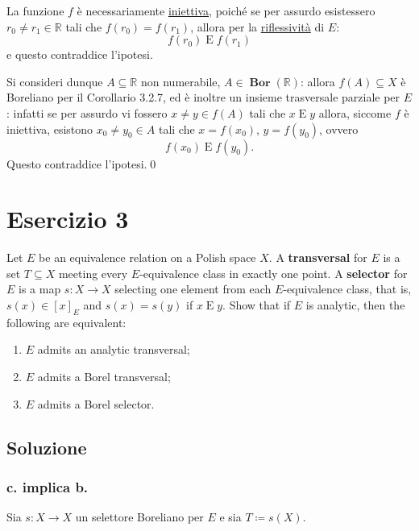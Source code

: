 \documentclass{article}
\newcommand{\1}{\mathds{1}}
\newcommand{\R}{\mathds{R}}
\begin{document}
La funzione \(f\) è necessariamente \uline{iniettiva}, poiché se per assurdo esistessero \(r_{0}\neq r_{1} \in \R\) tali che \(f(r_{0})=f(r_{1})\), allora per la \uline{riflessività} di \(E\):
\begin{equation*}
f(r_{0})\mathrel{E}f(r_{1})
\end{equation*}
e questo contraddice l'ipotesi.

Si consideri dunque \(A \subseteq \R\) non numerabile, \(A \in \bm{{\operatorname{Bor}}}(\R)\): allora \(f(A) \subseteq X\) è Boreliano per il Corollario 3.2.7, ed è inoltre un insieme trasversale parziale per \(E\): infatti se per assurdo vi fossero \(x\neq y \in f(A)\) tali che \(x\mathrel{E}y\) allora, siccome \(f\) è iniettiva, esistono \(x_{0}\neq y_{0} \in A\) tali che \(x=f(x_{0})\), \(y=f(y_{0})\), ovvero
\begin{equation*}
f(x_{0})\mathrel{E}f(y_{0}).
\end{equation*}
Questo contraddice l'ipotesi.\qed
\section{Esercizio 3}
\label{sec:org15bc569}

Let \(E\) be an equivalence relation on a Polish space \(X\). A \textbf{transversal} for \(E\) is a set \(T \subseteq X\) meeting every \(E\)-equivalence class in exactly one point. A \textbf{selector} for \(E\) is a map \(s: X \to X\) selecting one element from each \(E\)-equivalence class, that is, \(s(x) \in [x]_E\) and \(s(x) = s(y)\) if \(x \mathrel{E} y\). Show that if \(E\) is analytic, then the following are equivalent:

\begin{enumerate}
\item \(E\) admits an analytic transversal;
\item \(E\) admits a Borel transversal;
\item \(E\) admits a Borel selector.
\end{enumerate}
\subsection{Soluzione}
\label{sec:org529990d}

\subsubsection{c. implica b.}
\label{sec:org0801096}

Sia \(s:X\to X\) un selettore Boreliano per \(E\) e sia \(T\coloneqq s(X)\).
\end{document}
